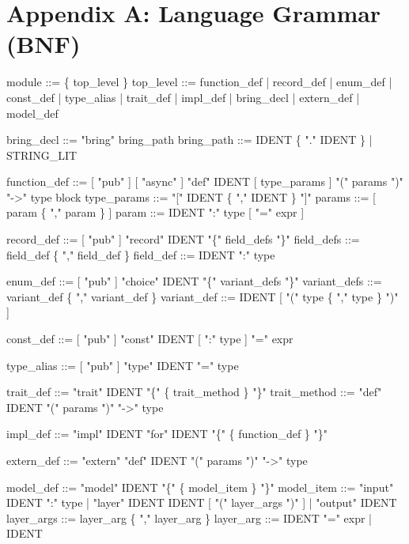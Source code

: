 \documentclass[
  english,
]{book}
\newenvironment{Shaded}{\begin{snugshade}}{\end{snugshade}}
\newcommand{\NormalTok}[1]{\textcolor[rgb]{0.83,0.83,0.83}{#1}}
\begin{document}
\section{Appendix A: Language Grammar
(BNF)}\label{appendix-a-language-grammar-bnf}

\begin{Shaded}
\begin{Highlighting}[]
\NormalTok{module      ::= \{ top\_level \}}
\NormalTok{top\_level   ::= function\_def}
\NormalTok{              | record\_def}
\NormalTok{              | enum\_def}
\NormalTok{              | const\_def}
\NormalTok{              | type\_alias}
\NormalTok{              | trait\_def}
\NormalTok{              | impl\_def}
\NormalTok{              | bring\_decl}
\NormalTok{              | extern\_def}
\NormalTok{              | model\_def}

\NormalTok{bring\_decl  ::= "bring" bring\_path}
\NormalTok{bring\_path  ::= IDENT \{ "." IDENT \}}
\NormalTok{              | STRING\_LIT}

\NormalTok{function\_def ::= [ "pub" ] [ "async" ] "def" IDENT [ type\_params ] "(" params ")" "{-}\textgreater{}" type block}
\NormalTok{type\_params  ::= "[" IDENT \{ "," IDENT \} "]"}
\NormalTok{params       ::= [ param \{ "," param \} ]}
\NormalTok{param        ::= IDENT ":" type [ "=" expr ]}

\NormalTok{record\_def  ::= [ "pub" ] "record" IDENT "\{" field\_defs "\}"}
\NormalTok{field\_defs  ::= field\_def \{ "," field\_def \}}
\NormalTok{field\_def   ::= IDENT ":" type}

\NormalTok{enum\_def    ::= [ "pub" ] "choice" IDENT "\{" variant\_defs "\}"}
\NormalTok{variant\_defs ::= variant\_def \{ "," variant\_def \}}
\NormalTok{variant\_def  ::= IDENT [ "(" type \{ "," type \} ")" ]}

\NormalTok{const\_def   ::= [ "pub" ] "const" IDENT [ ":" type ] "=" expr}

\NormalTok{type\_alias  ::= [ "pub" ] "type" IDENT "=" type}

\NormalTok{trait\_def   ::= "trait" IDENT "\{" \{ trait\_method \} "\}"}
\NormalTok{trait\_method ::= "def" IDENT "(" params ")" "{-}\textgreater{}" type}

\NormalTok{impl\_def    ::= "impl" IDENT "for" IDENT "\{" \{ function\_def \} "\}"}

\NormalTok{extern\_def  ::= "extern" "def" IDENT "(" params ")" "{-}\textgreater{}" type}

\NormalTok{model\_def   ::= "model" IDENT "\{" \{ model\_item \} "\}"}
\NormalTok{model\_item  ::= "input" IDENT ":" type}
\NormalTok{              | "layer" IDENT IDENT [ "(" layer\_args ")" ]}
\NormalTok{              | "output" IDENT}
\NormalTok{layer\_args  ::= layer\_arg \{ "," layer\_arg \}}
\NormalTok{layer\_arg   ::= IDENT "=" expr | IDENT}


\end{Highlighting}
\end{Shaded}
\end{document}

